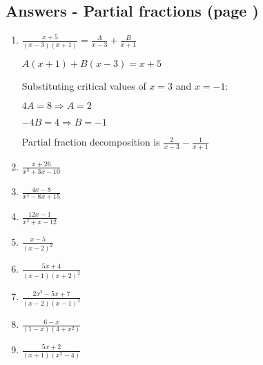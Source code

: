 \documentclass[../main.tex]{subfiles}
\begin{document}
\subsection*{Answers - Partial fractions (page \pageref{partial fractions})}
\label{Partial fractions answers}
\begin{enumerate}[itemsep=0.7cm]
    \item 
    $\frac{x+5}{(x-3)(x+1)}=\frac{A}{x-3}+\frac{B}{x+1}$

    $A(x+1)+B(x-3)=x+5$

    Substituting critical values of $x=3$ and $x=-1$:

    $4A=8 \Rightarrow A=2$

    $-4B=4 \Rightarrow B=-1$

    Partial fraction decomposition is $\frac{2}{x-3}-\frac{1}{x+1}$

    \item 
    $\frac{x+26}{x^3+3x-10}$

    \item 
    $\frac{4x-8}{x^2-8x+15}$

    \item 
    $\frac{12x-1}{x^2+x-12}$

    \item 
    $\frac{x-5}{(x-2)^2}$

    \item 
    $\frac{5x+4}{(x-1)(x+2)^2}$

    \item 
    $\frac{2x^2-5x+7}{(x-2)(x-1)^2}$

    \item 
    $\frac{6-x}{(1-x)(4+x^2)}$

    \item 
    $\frac{5x+2}{(x+1)(x^2-4)}$ 
    

\end{enumerate}
\end{document}
